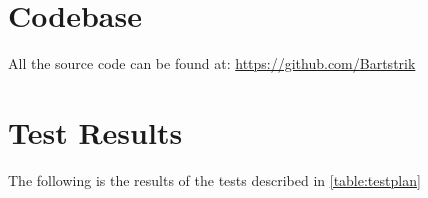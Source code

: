 
\appendix

\section{Codebase}
\label{appendix:codebase}
All the source code can be found at:
\url{https://github.com/Bartstrik}

\section{Test Results}
\label{appendix:test_results}
The following is the results of the tests described in \autoref{table:testplan}